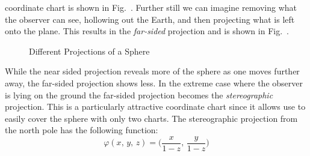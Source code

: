 \documentclass{book}                                                            %
\begin{document}
                coordinate chart is shown in Fig.~.
                Further still we can imagine removing what the observer can see,
                hollowing out the Earth, and then projecting what is left onto
                the plane. This results in the \textit{far-sided} projection
                and is shown in Fig.~.
                \begin{figure}[H]
                    \centering
                    \captionsetup{type=figure}
                    \begin{subfigure}[b]{0.49\textwidth}
                        \centering
                        \captionsetup{type=figure}
                        \label{fig:Near_Sided_Proj}
                    \end{subfigure}
                    \begin{subfigure}[b]{0.49\textwidth}
                        \centering
                        \captionsetup{type=figure}
                        \label{fig:Far_Sided_Proj}
                    \end{subfigure}
                    \caption{Different Projections of a Sphere}
                \end{figure}
                While the near sided projection reveals more of the sphere as
                one moves further away, the far-sided projection shows less. In
                the extreme case where the observer is lying on the ground the
                far-sided projection becomes the \textit{stereographic}
                projection. This is a particularly attractive coordinate chart
                since it allows use to easily cover the sphere with only two
                charts. The stereographic projection from the north pole has the
                following function:
                \begin{equation}
                    \varphi(x,\,y,\,z)=\Big(\frac{x}{1-z},\,\frac{y}{1-z}\Big)
                \end{equation}
\end{document}
